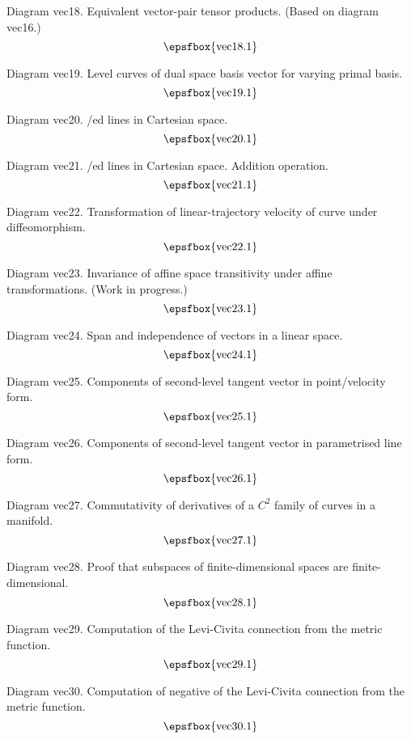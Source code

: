 Diagram vec18. Equivalent vector-pair tensor products. (Based on diagram
vec16.)
$$
\centerline{\epsfbox{vec18.1}}
$$

\filleject

Diagram vec19. Level curves of dual space basis vector for varying primal basis.
$$
\centerline{\epsfbox{vec19.1}}
$$

Diagram vec20. \Parametris/ed lines in Cartesian space.
$$
\centerline{\epsfbox{vec20.1}}
$$

Diagram vec21. \Parametris/ed lines in Cartesian space. Addition operation.
$$
\centerline{\epsfbox{vec21.1}}
$$

Diagram vec22. Transformation of linear-trajectory velocity of curve under
diffeomorphism.
$$
\centerline{\epsfbox{vec22.1}}
$$

\filleject

Diagram vec23. Invariance of affine space transitivity under affine
transformations. (Work in progress.)
$$
\centerline{\epsfbox{vec23.1}}
$$

Diagram vec24. Span and independence of vectors in a linear space.
$$
\centerline{\epsfbox{vec24.1}}
$$

Diagram vec25. Components of second-level tangent vector in point/velocity form.
$$
\centerline{\epsfbox{vec25.1}}
$$

Diagram vec26. Components of second-level tangent vector in parametrised line
form.
$$
\centerline{\epsfbox{vec26.1}}
$$

\filleject

Diagram vec27. Commutativity of derivatives of a $C^2$ family of curves in a
manifold.
$$
\centerline{\epsfbox{vec27.1}}
$$

Diagram vec28. Proof that subspaces of finite-dimensional spaces are
finite-dimensional.
$$
\centerline{\epsfbox{vec28.1}}
$$

Diagram vec29. Computation of the Levi-Civita connection from the metric
function.
$$
\centerline{\epsfbox{vec29.1}}
$$

Diagram vec30. Computation of negative of the Levi-Civita connection from the
metric function.
$$
\centerline{\epsfbox{vec30.1}}
$$

\filleject

